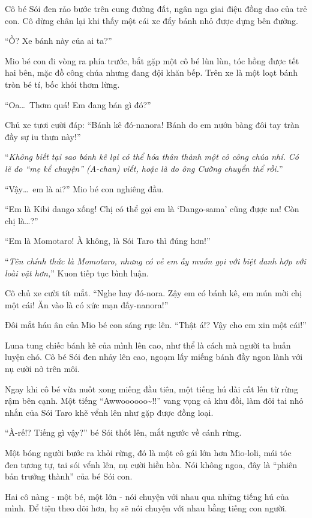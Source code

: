 \documentclass[../main.tex]{subfiles}
\begin{document}
Cô bé Sói đen rảo bước trên cung đường đất, ngân nga giai điệu đồng dao của trẻ con. Cô dừng chân lại khi thấy một cái xe đẩy bánh nhỏ được dựng bên đường.

``Ồ? Xe bánh này của ai ta?''

Mio bé con đi vòng ra phía trước, bắt gặp một cô bé lùn lùn, tóc hồng được tết hai bên, mặc đồ công chúa nhưng đang đội khăn bếp. Trên xe là một loạt bánh tròn bé tí, bốc khói thơm lừng.

``Oa\dots\ Thơm quá! Em đang bán gì đó?''

Chủ xe tươi cười đáp: ``Bánh kê đó-nanora! Bánh do em nướn bàng đôi tay tràn đầy sự iu thưn này!''

``\textit{Không biết tại sao bánh kê lại có thể hóa thân thành một cô công chúa nhí. Có lẽ do ``mẹ kể chuyện'' (A-chan) viết, hoặc là do ông Cường chuyển thể rồi.}''

``Vậy\dots\ em là ai?'' Mio bé con nghiêng đầu.

``Em là Kibi dango xống! Chị có thể gọi em là `Dango-sama' cũng được na! Còn chị là\dots?''

``Em là Momotaro! À không, là Sói Taro thì đúng hơn!''

``\textit{Tên chính thức là Momotaro, nhưng có vẻ em ấy muốn gọi với biệt danh hợp với loài vật hơn,}'' Kuon tiếp tục bình luận.

Cô chủ xe cười tít mắt. ``Nghe hay đó-nora. Zậy em có bánh kê, em mún mời chị một cái! Ăn vào là có xức mạn đấy-nanora!''

Đôi mắt háu ân của Mio bé con sáng rực lên. ``Thật á!? Vậy cho em xin một cái!''

Luna tung chiếc bánh kê của mình lên cao, như thể là cách mà người ta huấn luyện chó. Cô bé Sói đen nhảy lên cao, ngoạm lấy miếng bánh đầy ngon lành với nụ cười nở trên môi.

Ngay khi cô bé vừa nuốt xong miếng đầu tiên, một tiếng hú dài cất lên từ rừng rậm bên cạnh. Một tiếng ``Awwoooooo\~{}!!'' vang vọng cả khu đồi, làm đôi tai nhỏ nhắn của Sói Taro khẽ vểnh lên như gặp được đồng loại.

``À-rế!? Tiếng gì vậy?'' bé Sói thốt lên, mắt ngước về cánh rừng.

Một bóng người bước ra khỏi rừng, đó là một cô gái lớn hơn Mio-loli, mái tóc đen tương tự, tai sói vểnh lên, nụ cười hiền hòa. Nói không ngoa, đây là ``phiên bản trưởng thành'' của bé Sói con.

Hai cô nàng - một bé, một lớn - nói chuyện với nhau qua những tiếng hú của mình. Để tiện theo dõi hơn, họ sẽ nói chuyện với nhau bằng tiếng con người.
\end{document}
